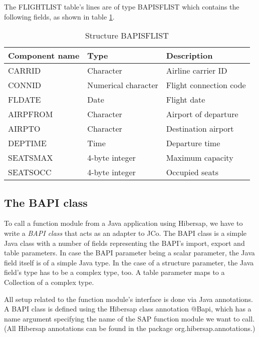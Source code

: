 The FLIGHTLIST table's lines are of type BAPISFLIST which contains the following fields, as shown in table
\ref{tab:Bapisflist}.

\begin{table}
  \centering
  \begin{tabular}{lll} \toprule
    \textbf{Component name} & \textbf{Type}        & \textbf{Description} \\ \midrule
    CARRID                  & Character            & Airline carrier ID \\ 
    CONNID                  & Numerical character  & Flight connection code \\ 
    FLDATE                  & Date                 & Flight date \\ 
    AIRPFROM                & Character            & Airport of departure \\ 
    AIRPTO                  & Character            & Destination airport \\ 
    DEPTIME                 & Time                 & Departure time \\ 
    SEATSMAX                & 4-byte integer       & Maximum capacity \\ 
    SEATSOCC                & 4-byte integer       & Occupied seats \\ \bottomrule
  \end{tabular}
  \caption{Structure BAPISFLIST}
  \label{tab:Bapisflist}
\end{table}


\subsection{The BAPI class}

To call a function module from a Java application using Hibersap, we have to write a \textit{BAPI class} that acts as
an adapter to JCo. The BAPI class is a simple Java class with a number of fields representing the BAPI's import,
export and table parameters. In case the BAPI parameter being a scalar parameter, the Java field itself is of a
simple Java type. In the case of a structure parameter, the Java field's type has to be a complex type, too.
A table parameter maps to a Collection of a complex type.

All setup related to the function module's interface is done via Java annotations.
A BAPI class is defined using the Hibersap class annotation @Bapi,
which has a name argument specifying the name of the SAP function module we want to call.
(All Hibersap annotations can be found in the package org.hibersap.annotations.)

